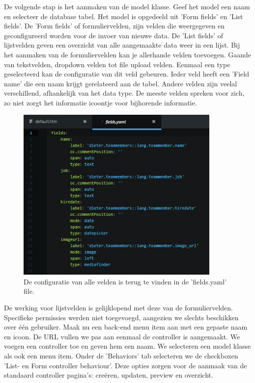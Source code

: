 \noindent
De volgende stap is het aanmaken van de model klasse. Geef het model een naam en selecteer de database tabel. Het model is opgedeeld uit 'Form fields' en 'List fields'. De 'Form fields' of formuliervelden, zijn velden die weergegeven en geconfigureerd worden voor de invoer van nieuwe data. De 'List fields' of lijstvelden geven een overzicht van alle aangemaakte data weer in een lijst.
\newline\newline
Bij het aanmaken van de formuliervelden kan je allerhande velden toevoegen. Gaande van tekstvelden, dropdown velden tot file upload velden. Eenmaal een type geselecteerd kan de configuratie van dit veld gebeuren. Ieder veld heeft een 'Field name' die een naam krijgt gerelateerd aan de tabel. Andere velden zijn veelal verschillend, afhankelijk van het data type. De meeste velden spreken voor zich, zo niet zorgt het informatie icoontje voor bijhorende informatie. 

\begin{figure}[!ht]
  \includegraphics[width=100mm]{img/oc-plugin-model-fields.png}
  \centering
  \caption{De configuratie van alle velden is terug te vinden in de 'fields.yaml' file.}
  \label{fig:Teammember model fields.}
\end{figure}

\pagebreak
\noindent
De werking voor lijstvelden is gelijklopend met deze van de formuliervelden. 
Specifieke permissies werden niet toegevoegd, aangezien we slechts beschikken over één gebruiker.
\noindent
Maak nu een back-end menu item aan met een gepaste naam en icoon. De URL vullen we pas aan eenmaal de controller is aangemaakt. 
\newline\newline
We voegen een controller toe en geven hem een naam. We selecteren een model klasse als ook een menu item. Onder de 'Behaviors' tab selecteren we de checkboxen 'List- en Form controller behaviour'.
Deze opties zorgen voor de aanmaak van de standaard controller pagina's:  creëren, updaten, preview en overzicht.

